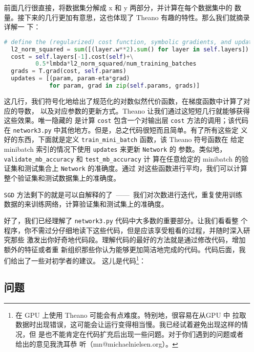 前面几行很直接，将数据集分解成 x 和 y 两部分，并计算在每个数据集中\minibatch{}的
数量。接下来的几行更加有意思，这也体现了 Theano 有趣的特性。那么我们就摘录详解一
下：

\begin{lstlisting}[language=Python]
  # define the (regularized) cost function, symbolic gradients, and updates
  l2_norm_squared = sum([(layer.w**2).sum() for layer in self.layers])
  cost = self.layers[-1].cost(self)+\
         0.5*lmbda*l2_norm_squared/num_training_batches
  grads = T.grad(cost, self.params)
  updates = [(param, param-eta*grad) 
             for param, grad in zip(self.params, grads)]
\end{lstlisting}

这几行，我们符号化地给出了规范化的对数似然代价函数，在梯度函数中计算了对应的导数，
以及对应参数的更新方式。Theano 让我们通过这短短几行就能够获得这些效果。唯一隐藏的
是计算 \lstinline!cost! 包含一个对输出层 \lstinline!cost! 方法的调用；该代码
在 \lstinline!network3.py! 中其他地方。但是，总之代码很短而且简单。有了所有这些定
义好的东西，下面就是定义 \lstinline!train_mini_batch! 函数，该 Theano 符号函数在
给定 minibatch 索引的情况下使用 \lstinline!updates! 来更新 \lstinline!Network! 的
参数。类似地，\lstinline!validate_mb_accuracy! 和 \lstinline!test_mb_accuracy! 计
算在任意给定的 minibatch 的验证集和测试集合上 \lstinline!Network! 的准确度。通过
对这些函数进行平均，我们可以计算整个验证集和测试数据集上的准确度。

\lstinline!SGD! 方法剩下的就是可以自解释的了~——~我们对次数进行迭代，重复使用训练
数据的\minibatch{}来训练网络，计算验证集和测试集上的准确度。

好了，我们已经理解了 \lstinline!network3.py! 代码中大多数的重要部分。让我们看看整
个程序，你不需过分仔细地读下这些代码，但是应该享受粗看的过程，并随时深入研究那些
激发出你好奇地代码段。理解代码的最好的方法就是通过修改代码，增加额外的特征或者重
新组织那些你认为能够更加简洁地完成的代码。代码后面，我们给出了一些对初学者的建议。
这儿是代码\footnote{在 GPU 上使用 Theano 可能会有点难度。特别地，很容易在从GPU 中
  拉取数据时出现错误，这可能会让运行变得相当慢。我已经试着避免出现这样的情况，但
  是也不能肯定在代码扩充后出现一些问题。对于你们遇到的问题或者给出的意见我洗耳恭
  听（mn@michaelnielsen.org）。}：



\subsection*{问题}

